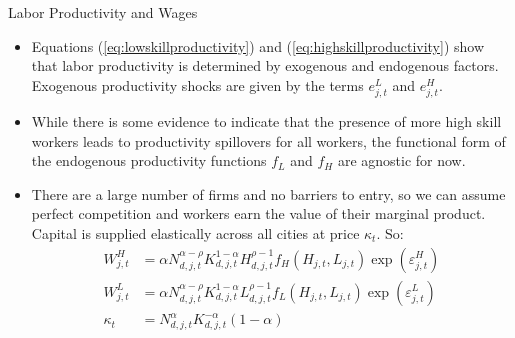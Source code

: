 \documentclass[aspectratio=169]{beamer}
\begin{document}
\begin{frame}{Labor Productivity and Wages}

\begin{itemize}
    \item<1-> Equations (\ref{eq:lowskillproductivity}) and (\ref{eq:highskillproductivity}) show that labor productivity is determined by exogenous and endogenous factors.  Exogenous productivity shocks are given by the terms $ e_{j,t}^L $ and $ e_{j,t}^H $.
    \item<2-> While there is some evidence to indicate that the presence of more high skill workers leads to productivity spillovers for all workers, the functional form of the endogenous productivity functions $ f_L $ and $ f_H $ are agnostic for now.
    \item<3-> There are a large number of firms and no barriers to entry, so we can assume perfect competition and workers earn the value of their marginal product.  Capital is supplied elastically across all cities at price $ \kappa_t $. So:
    \begin{equation*}
        \begin{split}
            W_{j,t}^{H} &= \alpha N_{d,j,t}^{\alpha - \rho} K_{d,j,t}^{1 - \alpha} H_{d,j,t}^{\rho - 1} f_{H}\left( H_{j,t}, L_{j,t} \right) \exp\left( \varepsilon_{j,t}^{H} \right) \\
            W_{j,t}^{L} &= \alpha N_{d,j,t}^{\alpha - \rho} K_{d,j,t}^{1 - \alpha} L_{d,j,t}^{\rho - 1} f_{L}\left( H_{j,t}, L_{j,t} \right) \exp\left( \varepsilon_{j,t}^{L} \right) \\
            \kappa_{t} &= N_{d,j,t}^{\alpha} K_{d,j,t}^{-\alpha}\left( 1 - \alpha \right)
        \end{split}
    \end{equation*}
\end{itemize}
    
\end{frame}

\end{document}
